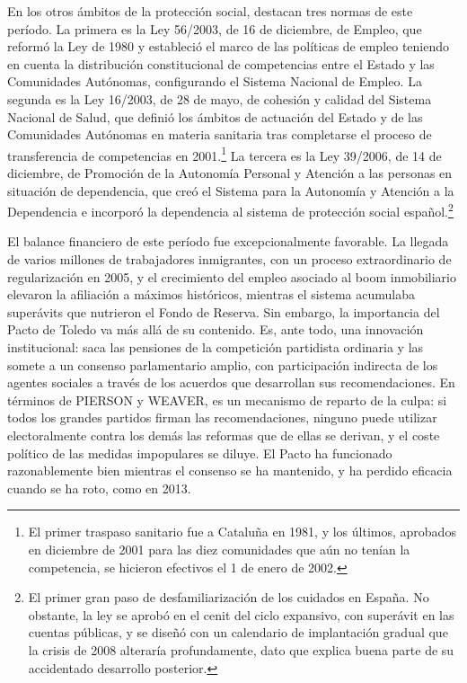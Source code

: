 \documentclass[10pt,a4paper]{article}
\begin{document}
En los otros ámbitos de la protección social, destacan tres normas de este período. La primera es la Ley 56/2003, de 16 de diciembre, de Empleo, que reformó la Ley de 1980 y estableció el marco de las políticas de empleo teniendo en cuenta la distribución constitucional de competencias entre el Estado y las Comunidades Autónomas, configurando el Sistema Nacional de Empleo. La segunda es la Ley 16/2003, de 28 de mayo, de cohesión y calidad del Sistema Nacional de Salud, que definió los ámbitos de actuación del Estado y de las Comunidades Autónomas en materia sanitaria tras completarse el proceso de transferencia de competencias en 2001.\footnote{%
    El primer traspaso sanitario fue a Cataluña en 1981, y los últimos, aprobados en diciembre de 2001 para las diez comunidades que aún no tenían la competencia, se hicieron efectivos el 1 de enero de 2002.
} La tercera es la Ley 39/2006, de 14 de diciembre, de Promoción de la Autonomía Personal y Atención a las personas en situación de dependencia, que creó el Sistema para la Autonomía y Atención a la Dependencia e incorporó la dependencia al sistema de protección social español.\footnote{%
    El primer gran paso de desfamiliarización de los cuidados en España. No obstante, la ley se aprobó en el cenit del ciclo expansivo, con superávit en las cuentas públicas, y se diseñó con un calendario de implantación gradual que la crisis de 2008 alteraría profundamente, dato que explica buena parte de su accidentado desarrollo posterior.
}

El balance financiero de este período fue excepcionalmente favorable. La llegada de varios millones de trabajadores inmigrantes, con un proceso extraordinario de regularización en 2005, y el crecimiento del empleo asociado al boom inmobiliario elevaron la afiliación a máximos históricos, mientras el sistema acumulaba superávits que nutrieron el Fondo de Reserva. Sin embargo, la importancia del Pacto de Toledo va más allá de su contenido. Es, ante todo, una innovación institucional: saca las pensiones de la competición partidista ordinaria y las somete a un consenso parlamentario amplio, con participación indirecta de los agentes sociales a través de los acuerdos que desarrollan sus recomendaciones. En términos de PIERSON y WEAVER, es un mecanismo de reparto de la culpa: si todos los grandes partidos firman las recomendaciones, ninguno puede utilizar electoralmente contra los demás las reformas que de ellas se derivan, y el coste político de las medidas impopulares se diluye. El Pacto ha funcionado razonablemente bien mientras el consenso se ha mantenido, y ha perdido eficacia cuando se ha roto, como en 2013. 
\end{document}
